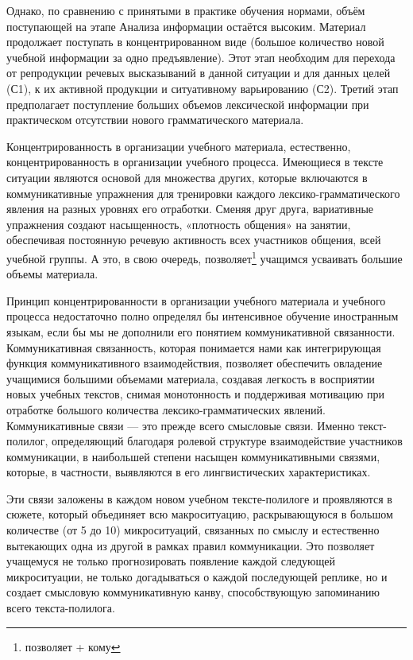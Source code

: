 Однако, по сравнению с принятыми в практике обучения нормами, объём поступающей на этапе Анализа информации остаётся высоким. Материал продолжает поступать в концентрированном виде (большое количество новой учебной информации за одно предъявление). Этот этап необходим для перехода от репродукции речевых высказываний в данной ситуации и для данных целей (С1), к их активной продукции и ситуативному варьированию (С2). Третий этап предполагает поступление больших объемов лексической информации при практическом отсутствии нового грамматического материала.

Концентрированность в организации учебного материала, естественно,  концентрированность в организации учебного процесса. Имеющиеся в тексте ситуации являются основой для множества других, которые включаются в коммуникативные упражнения для тренировки каждого лексико-грамматического явления на разных уровнях его отработки. Сменяя друг друга, вариативные упражнения создают насыщенность, «плотность общения» на занятии, обеспечивая постоянную речевую активность всех участников общения, всей учебной группы. А это, в свою очередь, позволяет\footnote{позволяет + кому} учащимся усваивать большие объемы материала.

Принцип концентрированности в организации учебного материала и учебного процесса недостаточно полно определял бы интенсивное обучение иностранным языкам, если бы мы не дополнили его понятием коммуникативной связанности. Коммуникативная связанность, которая понимается нами как интегрирующая функция коммуникативного взаимодействия, позволяет обеспечить овладение учащимися большими объемами материала, создавая легкость в восприятии новых учебных текстов, снимая монотонность и поддерживая мотивацию при отработке большого количества лексико-грамматических явлений. Коммуникативные связи --- это прежде всего смысловые связи. Именно текст-полилог, определяющий благодаря ролевой структуре взаимодействие участников коммуникации, в наибольшей степени насыщен коммуникативными связями, которые, в частности, выявляются в его лингвистических характеристиках.

Эти связи заложены в каждом новом учебном тексте-полилоге и проявляются в сюжете, который объединяет всю макроситуацию, раскрывающуюся в большом количестве (от 5 до 10) микроситуаций, связанных по смыслу и естественно вытекающих одна из другой в рамках правил коммуникации. Это позволяет учащемуся не только прогнозировать появление каждой следующей микроситуации, не только догадываться о каждой последующей реплике, но и создает смысловую коммуникативную канву, способствующую запоминанию всего текста-полилога.

